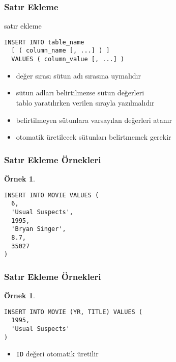 \documentclass[dvipsnames]{beamer}
\theoremstyle{definition}
\theoremstyle{example}
\newtheorem{ornek}[theorem]{Örnek}
\theoremstyle{plain}
\begin{document}
\begin{frame}[fragile]
  \frametitle{Satır Ekleme}

  \begin{block}{satır ekleme}
    \begin{lstlisting}
INSERT INTO table_name
  [ ( column_name [, ...] ) ]
  VALUES ( column_value [, ...] )
    \end{lstlisting}
  \end{block}

  \pause
  \begin{itemize}
    \item değer sırası sütun adı sırasına uymalıdır
    \item sütun adları belirtilmezse sütun değerleri\\
      tablo yaratılırken verilen sırayla yazılmalıdır
    \item belirtilmeyen sütunlara varsayılan değerleri atanır

    \pause
    \medskip
    \item otomatik üretilecek sütunları belirtmemek gerekir
  \end{itemize}
\end{frame}

\begin{frame}[fragile]
  \frametitle{Satır Ekleme Örnekleri}

  \begin{ornek}
    \begin{lstlisting}
INSERT INTO MOVIE VALUES (
  6,
  'Usual Suspects',
  1995,
  'Bryan Singer',
  8.7,
  35027
)
    \end{lstlisting}
  \end{ornek}
\end{frame}

\begin{frame}[fragile]
  \frametitle{Satır Ekleme Örnekleri}

  \begin{ornek}
    \begin{lstlisting}
INSERT INTO MOVIE (YR, TITLE) VALUES (
  1995,
  'Usual Suspects'
)
    \end{lstlisting}

    \pause
    \begin{itemize}
      \item \texttt{ID} değeri otomatik üretilir
    \end{itemize}
  \end{ornek}
\end{frame}
\end{document}
